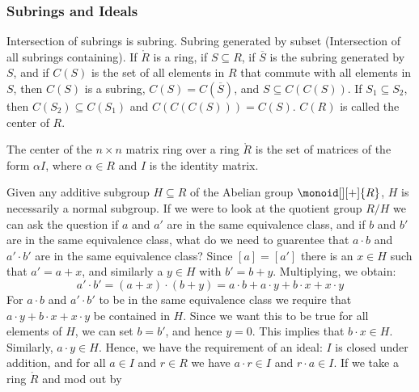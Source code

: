         \subsubsection{Subrings and Ideals}
            Intersection of subrings is subring. Subring generated by
            subset (Intersection of all subrings containing).
            If $\ring{R}$ is a ring, if $S\subseteq{R}$, if $\overline{S}$
            is the subring generated by $S$, and if $C(S)$ is the set of
            all elements in $R$ that commute with all elements in $S$,
            then $C(S)$ is a subring, $C(S)=C(\overline{S})$, and
            $S\subseteq{C}(C(S))$. If $S_{1}\subseteq{S}_{2}$, then
            $C(S_{2})\subseteq{C}(S_{1})$ and
            $C(C(C(S)))=C(S)$. $C(R)$ is called the center of $R$.
            \begin{example}
                The center of the $n\times{n}$ matrix ring over a ring
                $\ring{R}$ is the set of matrices of the form $\alpha{I}$,
                where $\alpha\in{R}$ and $I$ is the identity matrix.
            \end{example}
            Given any additive subgroup $H\subseteq{R}$ of the Abelian
            group $\monoid[][+]{R}$, $H$ is necessarily a normal subgroup.
            If we were to look at the quotient group $R/H$ we can ask the
            question if $a$ and $a'$ are in the same equivalence class, and
            if $b$ and $b'$ are in the same equivalence class, what do we
            need to guarentee that $a\cdot{b}$ and $a'\cdot{b}'$ are in the
            same equivalence class? Since $[a]=[a']$ there is an $x\in{H}$
            such that $a'=a+x$, and similarly a $y\in{H}$ with $b'=b+y$.
            Multiplying, we obtain:
            \begin{equation}
                a'\cdot{b}'=(a+x)\cdot(b+y)
                    =a\cdot{b}+a\cdot{y}+b\cdot{x}+x\cdot{y}
            \end{equation}
            For $a\cdot{b}$ and $a'\cdot{b}'$ to be in the same equivalence
            class we require that $a\cdot{y}+b\cdot{x}+x\cdot{y}$ be
            contained in $H$. Since we want this to be true for all elements
            of $H$, we can set $b=b'$, and hence $y=0$. This implies that
            $b\cdot{x}\in{H}$. Similarly, $a\cdot{y}\in{H}$. Hence, we have
            the requirement of an ideal: $I$ is closed under addition, and
            for all $a\in{I}$ and $r\in{R}$ we have $a\cdot{r}\in{I}$ and
            $r\cdot{a}\in{I}$. If we take a ring $\ring{R}$ and mod out by

